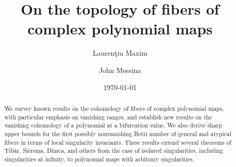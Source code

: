 \documentclass[12pt,leqno,twoside]{amsart}
\theoremstyle{remark}
\theoremstyle{remark}
\theoremstyle{definition}
\theoremstyle{remark}
\theoremstyle{remark}
\theoremstyle{remark}
\numberwithin{equation}{section}  %
\begin{document}
\title[Fibers of polynomial maps]
{On the topology of fibers of complex polynomial maps}


\author{Lauren\c{t}iu Maxim}
\address{L. Maxim : Department of Mathematics, University of Wisconsin-Madison, 480 Lincoln Drive, Madison WI 53706-1388, USA,  \newline Institute of Mathematics of the Romanian Academy, P.O. Box 1-764, 70700 Bucharest, ROMANIA}

\author{John Messina}
\address{J. Messina : Department of Mathematics, University of Wisconsin-Madison, 480 Lincoln Drive, Madison WI 53706-1388, USA}



\begin{abstract}


We survey known results on the cohomology of fibers of complex polynomial maps, with particular emphasis on vanishing ranges, and establish new results on the vanishing cohomology of a polynomial at a bifurcation value. We also derive sharp upper bounds for the first possibly nonvanishing Betti number of general and atypical fibers in terms of local singularity invariants. These results extend several theorems of Tib\u{a}r, Siersma, Dimca, and others from the case of isolated singularities, including singularities at infinity, to polynomial maps with arbitrary singularities.
\end{abstract}

\date{\today}


\end{document}
